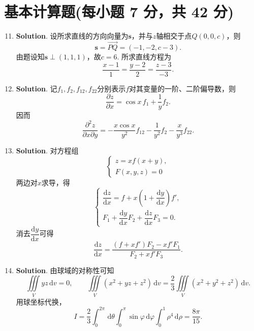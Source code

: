 \documentclass[../main.tex]{subfiles}
\begin{document}
\section{基本计算题(每小题 7 分，共 42 分)}
\begin{enumerate}
  \setcounter{enumi}{10}
  \item \textbf{Solution}. 设所求直线的方向向量为$\boldsymbol{s}$，并与$z$轴相交于点$Q(0,0,c)$，则
        \[
          \boldsymbol{s}=\overrightarrow{PQ}=(-1,-2,c-3).
        \]
        由题设知$\boldsymbol{s}\perp(1,1,1)$，故$c=6$.
        所求直线方程为
        \[
          \frac{x-1}{1}=\frac{y-2}{2}=\frac{z-3}{-3}.
        \]

  \item \textbf{Solution}. 记$f_{1},f_{2},f_{12},f_{22}$分别表示$f$对其变量的一阶、二阶偏导数，则
        \[
          \frac{\partial z}{\partial x}=\cos x\,f_{1}+\frac{1}{y}f_{2}.
        \]
        因而
        \[
          \frac{\partial^2 z}{\partial x \partial y}=-\frac{x\cos x}{y^{2}}f_{12}-\frac{1}{y^{2}}f_{2}-\frac{x}{y^{3}}f_{22}.
        \]

  \item \textbf{Solution}. 对方程组
        \[
          \begin{cases}
            z=xf(x+y), \\
            F(x,y,z)=0
          \end{cases}
        \]
        两边对$x$求导，得
        \[
          \begin{cases}
            \dfrac{\mathrm{d}z}{\mathrm{d}x}=f+x\left(1+\dfrac{\mathrm{d}y}{\mathrm{d}x}\right)f', \\[8pt]
            F_{1}+\dfrac{\mathrm{d}y}{\mathrm{d}x}F_{2}+\dfrac{\mathrm{d}z}{\mathrm{d}x}F_{3}=0.
          \end{cases}
        \]
        消去$\dfrac{\mathrm{d}y}{\mathrm{d}x}$可得
        \[
          \frac{\mathrm{d}z}{\mathrm{d}x}
          =\frac{(f+xf')F_{2}-xf'F_{1}}{F_{2}+xf'F_{3}}.
        \]

  \item \textbf{Solution}. 由球域的对称性可知
        \[
          \iiint\limits_{V}yz\,\mathrm{d}v=0,\qquad
          \iiint\limits_{V}(x^{2}+yz+z^{2})\,\mathrm{d}v
          =\frac{2}{3}\iiint\limits_{V}(x^{2}+y^{2}+z^{2})\,\mathrm{d}v.
        \]
        用球坐标代换，
        \[
          I=\frac{2}{3}\int_{0}^{2\pi}\,\mathrm{d}\theta\int_{0}^{\pi}\sin\varphi\,\mathrm{d}\varphi\int_{0}^{1}\rho^{4}\,\mathrm{d}\rho
          =\frac{8\pi}{15}.
        \]


\end{enumerate}
\end{document}
